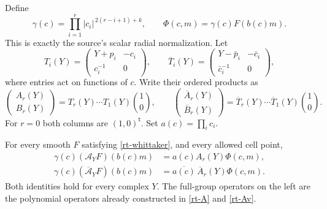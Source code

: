 Define
\begin{equation}\label{rt-gauge}
 \gamma(c)=\prod_{i=1}^{r}
       |c_i|^{\,2(r-i+1)+k},
 \qquad
 \Phi(c,m)=\gamma(c)F(b(c)m).
\end{equation}
This is exactly the source's scalar radial
normalization.  Let
\[
 T_i(Y)=
 \begin{pmatrix}Y+p_i&-c_i\\ c_i^{-1}&0\end{pmatrix},
 \qquad
 \overline T_i(Y)=
 \begin{pmatrix}Y-\bar p_i&-\bar c_i\\
                         \bar c_i^{-1}&0\end{pmatrix},
\]
where entries act on functions of $c$.
Write their ordered products as
\[
 \begin{pmatrix}A_r(Y)\\ B_r(Y)\end{pmatrix}
       =T_r(Y)\cdots T_1(Y)\binom10,\qquad
 \begin{pmatrix}\overline A_r(Y)\\ \overline B_r(Y)\end{pmatrix}
       =\overline T_r(Y)\cdots\overline T_1(Y)\binom10.
\]
For $r=0$ both columns are $(1,0)^{\mathsf t}$.
Set $a(c)=\prod_i c_i$.

\begin{theorem}\label{rt-actual-lifts}
For every smooth $F$ satisfying
\eqref{rt-whittaker}, and every allowed cell point,
\begin{align}
 \gamma(c)(\mathcal A_YF)(b(c)m)
       &=a(c) A_r(Y)\Phi(c,m),\label{rt-lift-first}\\
 \gamma(c)(\overline{\mathcal A}_YF)(b(c)m)
       &=\overline{a(c)}\,\overline A_r(Y)\Phi(c,m).
                                             \label{rt-lift-second}
\end{align}
Both identities hold for every complex $Y$.
The full-group operators on the left are the
polynomial operators already constructed in
\eqref{rt-A} and \eqref{rt-Av}.
\end{theorem}

